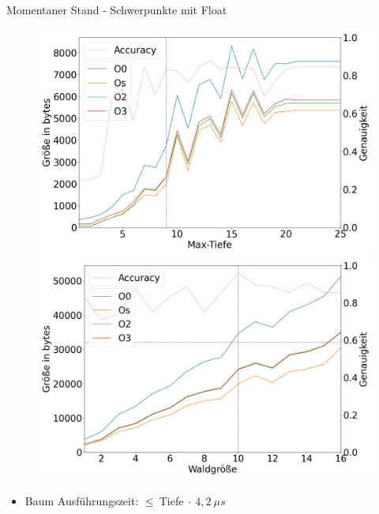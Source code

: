 \documentclass[10pt]{beamer}
\begin{document}
\begin{frame}{Momentaner Stand - Schwerpunkte mit Float}
\begin{figure}
    \begin{minipage}[c]{0.49\linewidth}
        \includegraphics[width=\linewidth]{klisch_float_tree.png}
    \end{minipage}
    \hfill
    \begin{minipage}[c]{0.49\linewidth}
        \includegraphics[width=\linewidth]{klisch_float_forest.png}
    \end{minipage}%
\end{figure}
\begin{itemize}
    \item Baum Ausführungszeit: $\leq\ $Tiefe$\ \cdot \ 4,2\ \mu s$

\end{itemize}
\end{frame}
\end{document}
